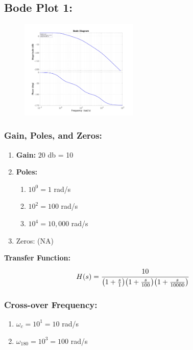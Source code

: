 \documentclass[letter]{article}
\numberwithin{equation}{section}
\begin{document}
\subsection{Bode Plot 1:}
\begin{figure}[ht]
	\centering
	\includegraphics[width=0.5\textwidth]{figs/pblm3a.jpg}
\end{figure}

\subsubsection{Gain, Poles, and Zeros:}
\begin{enumerate}
	\item \textbf{Gain:}  $20$ db = 10
	\item \textbf{Poles:}
	\begin{enumerate}
		\item $10^{0} = 1$ rad/s
		\item $10^{2} = 100$ rad/s
		\item $10^{4} = 10,000$ rad/s
	\end{enumerate}
	\item Zeros: (NA)
\end{enumerate}

\textbf{Transfer Function:}\[
	H(s) = \cfrac{10}{
		\qty(1 + \frac{s}{1}) \qty(1 + \frac{s}{100}) \qty(1 + \frac{s}{10000})
		}
\]

\subsubsection{Cross-over Frequency:}
\begin{enumerate}
	\item $\omega_c = 10^{1} = 10$ rad/s
	\item $\omega_{180} = 10^{3} = 100$ rad/s
\end{enumerate}



\newpage
\end{document}
